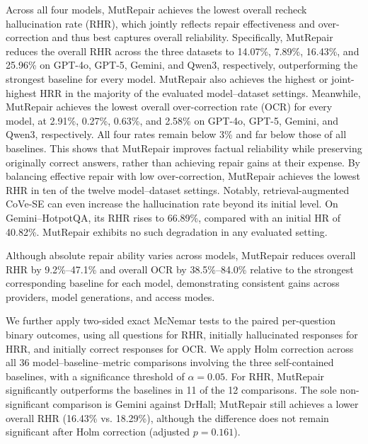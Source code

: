\documentclass[acmsmall,screen,review,anonymous]{acmart}
\begin{document}
Across all four models, MutRepair achieves the lowest overall recheck hallucination rate (RHR), which jointly reflects repair effectiveness and over-correction and thus best captures overall reliability. Specifically, MutRepair reduces the overall RHR across the three datasets to 14.07\%, 7.89\%, 16.43\%, and 25.96\% on GPT-4o, GPT-5, Gemini, and Qwen3, respectively, outperforming the strongest baseline for every model. MutRepair also achieves the highest or joint-highest HRR in the majority of the evaluated model--dataset settings. Meanwhile, MutRepair achieves the lowest overall over-correction rate (OCR) for every model, at 2.91\%, 0.27\%, 0.63\%, and 2.58\% on GPT-4o, GPT-5, Gemini, and Qwen3, respectively. All four rates remain below 3\% and far below those of all baselines. This shows that MutRepair improves factual reliability while preserving originally correct answers, rather than achieving repair gains at their expense. By balancing effective repair with low over-correction, MutRepair achieves the lowest RHR in ten of the twelve model--dataset settings. Notably, retrieval-augmented CoVe-SE can even increase the hallucination rate beyond its initial level. On Gemini--HotpotQA, its RHR rises to 66.89\%, compared with an initial HR of 40.82\%. MutRepair exhibits no such degradation in any evaluated setting.

Although absolute repair ability varies across models, MutRepair reduces overall RHR by 9.2\%--47.1\% and overall OCR by 38.5\%--84.0\% relative to the strongest corresponding baseline for each model, demonstrating consistent gains across providers, model generations, and access modes.

We further apply two-sided exact McNemar tests to the paired per-question binary outcomes, using all questions for RHR, initially hallucinated responses for HRR, and initially correct responses for OCR. We apply Holm correction across all 36 model--baseline--metric comparisons involving the three self-contained baselines, with a significance threshold of $\alpha=0.05$. For RHR, MutRepair significantly outperforms the baselines in 11 of the 12 comparisons. The sole non-significant comparison is Gemini against DrHall; MutRepair still achieves a lower overall RHR (16.43\% vs. 18.29\%), although the difference does not remain significant after Holm correction (adjusted $p=0.161$).
\end{document}
